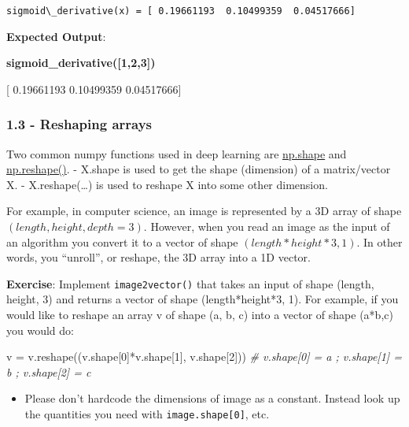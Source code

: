 \documentclass[11pt]{article}
\newenvironment{Shaded}{}{}
\newcommand{\DecValTok}[1]{\textcolor[rgb]{0.25,0.63,0.44}{{#1}}}
\newcommand{\CommentTok}[1]{\textcolor[rgb]{0.38,0.63,0.69}{\textit{{#1}}}}
\newcommand{\NormalTok}[1]{{#1}}
\begin{document}
    \begin{Verbatim}[commandchars=\\\{\}]
sigmoid\_derivative(x) = [ 0.19661193  0.10499359  0.04517666]

    \end{Verbatim}

    \textbf{Expected Output}:

\textbf{sigmoid\_derivative({[}1,2,3{]})}

{[} 0.19661193 0.10499359 0.04517666{]}

    \subsubsection{1.3 - Reshaping arrays}\label{reshaping-arrays}

Two common numpy functions used in deep learning are
\href{https://docs.scipy.org/doc/numpy/reference/generated/numpy.ndarray.shape.html}{np.shape}
and
\href{https://docs.scipy.org/doc/numpy/reference/generated/numpy.reshape.html}{np.reshape()}.
- X.shape is used to get the shape (dimension) of a matrix/vector X. -
X.reshape(\ldots{}) is used to reshape X into some other dimension.

For example, in computer science, an image is represented by a 3D array
of shape $(length, height, depth = 3)$. However, when you read an image
as the input of an algorithm you convert it to a vector of shape
$(length*height*3, 1)$. In other words, you ``unroll'', or reshape, the
3D array into a 1D vector.

\textbf{Exercise}: Implement \texttt{image2vector()} that takes an input
of shape (length, height, 3) and returns a vector of shape
(length*height*3, 1). For example, if you would like to reshape an array
v of shape (a, b, c) into a vector of shape (a*b,c) you would do:

\begin{Shaded}
\begin{Highlighting}[]
\NormalTok{v = v.reshape((v.shape[}\DecValTok{0}\NormalTok{]*v.shape[}\DecValTok{1}\NormalTok{], v.shape[}\DecValTok{2}\NormalTok{])) }\CommentTok{# v.shape[0] = a ; v.shape[1] = b ; v.shape[2] = c}
\end{Highlighting}
\end{Shaded}

\begin{itemize}
\itemsep1pt\parskip0pt
\item
  Please don't hardcode the dimensions of image as a constant. Instead
  look up the quantities you need with \texttt{image.shape{[}0{]}}, etc.
\end{itemize}
\end{document}
